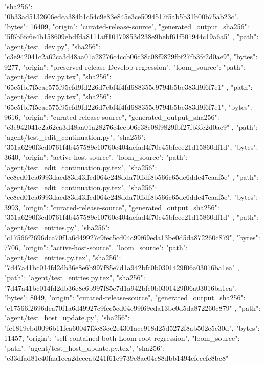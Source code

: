 {{      "sha256": "0b33ad5132606edca384b1c54c9e83e845e3ce5094517f5ab5b31b00b75ab23c",
      "bytes": 16409,
      "origin": "curated-release-source",
      "generated_output_sha256": "5f6b5fc6e4b158609ebdfda8111aff10179853d238e9bebf61f501944c19a6a5"
    },
    {
      "path": "agent/test_dev.py",
      "sha256": "c3e942041c2a62ca3d48aa01a28276c4ccb06c38c08f9829fbf27fb3fc2d0ae9",
      "bytes": 9277,
      "origin": "preserved-release-Develop-regression",
      "loom_source": {
        "path": "agent/test_dev.py.tex",
        "sha256": "65e5fbf7f5cae575f95efd9fd226d7cbf4f4fd688355e9794b5be383d9f6f7e1"
      }
    },
    {
      "path": "agent/test_dev.py.tex",
      "sha256": "65e5fbf7f5cae575f95efd9fd226d7cbf4f4fd688355e9794b5be383d9f6f7e1",
      "bytes": 9616,
      "origin": "curated-release-source",
      "generated_output_sha256": "c3e942041c2a62ca3d48aa01a28276c4ccb06c38c08f9829fbf27fb3fc2d0ae9"
    },
    {
      "path": "agent/test_edit_continuation.py",
      "sha256": "351a6290f3cd0761f4b457589e10760e404aefad4f70c45bfeee21d15860df1d",
      "bytes": 3640,
      "origin": "active-host-source",
      "loom_source": {
        "path": "agent/test_edit_continuation.py.tex",
        "sha256": "ce8cd01ea6993daed83d43ffcd064c248dda70ffdf8b566c65de6ddc47eaaf5e"
      }
    },
    {
      "path": "agent/test_edit_continuation.py.tex",
      "sha256": "ce8cd01ea6993daed83d43ffcd064c248dda70ffdf8b566c65de6ddc47eaaf5e",
      "bytes": 3993,
      "origin": "curated-release-source",
      "generated_output_sha256": "351a6290f3cd0761f4b457589e10760e404aefad4f70c45bfeee21d15860df1d"
    },
    {
      "path": "agent/test_entries.py",
      "sha256": "c17566f2696dca70f1a6d49927c9fec5cd04c99f69eda13be0d5da872260c879",
      "bytes": 7706,
      "origin": "active-host-source",
      "loom_source": {
        "path": "agent/test_entries.py.tex",
        "sha256": "7d47a41bc014fd2db36e8e6b997f85e7d1a942bfc0b0301429f06a03016ba1ea"
      }
    },
    {
      "path": "agent/test_entries.py.tex",
      "sha256": "7d47a41bc014fd2db36e8e6b997f85e7d1a942bfc0b0301429f06a03016ba1ea",
      "bytes": 8049,
      "origin": "curated-release-source",
      "generated_output_sha256": "c17566f2696dca70f1a6d49927c9fec5cd04c99f69eda13be0d5da872260c879"
    },
    {
      "path": "agent/test_host_update.py",
      "sha256": "fe1819ebd0096b11fca60047f3c83cc2e4301ace918d25d5272f8ab502e5c30d",
      "bytes": 11457,
      "origin": "self-contained-both-Loom-root-regression",
      "loom_source": {
        "path": "agent/test_host_update.py.tex",
        "sha256": "e33dfad81c40faa1eca2dcceab241f61c9739e8ae04c88dbb1494cfecefc8bc8"
}}}
